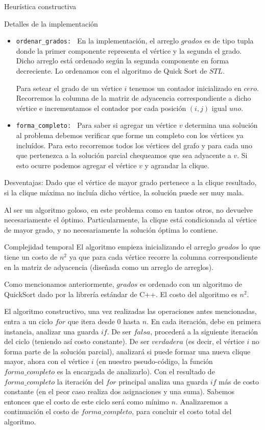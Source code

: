 \begin{section}{Heurística constructiva}
\begin{subsection}{Detalles de la implementación}
			\begin{itemize}
				\item \texttt{ordenar\_grados: } En la implementación, el arreglo $grados$ es de tipo tupla donde la primer componente representa el vértice y la segunda el grado. Dicho arreglo está ordenado según la segunda componente en forma decreciente. Lo ordenamos con el algoritmo de Quick Sort de $STL$.
				
				Para setear el grado de un vértice $i$ tenemos un contador inicializado en $cero$. Recorremos la columna de la matriz de adyacencia correspondiente a dicho vértice e incrementamos el contador por cada posición $(i,j)$ igual $uno$.
				\item \texttt{forma\_completo: } Para saber si agregar un vértice $v$ determina una solución al problema debemos verificar que forme un completo con los vértices ya incluídos. Para esto recorremos todos los vértices del grafo y para cada uno que pertenezca a la solución parcial chequeamos que sea adyacente a $v$. Si esto ocurre podemos agregar el vértice $v$ y agrandar la clique.
			\end{itemize}
		\end{subsection}
		\begin{subsection}{Desventajas: }
			Dado que el vértice de mayor grado pertenece a la clique resultado, si la clique máxima no incluía dicho vértice, la solución puede ser muy mala.
			
			Al ser un algoritmo goloso, en este problema como en tantos otros, no devuelve necesariamente el óptimo. Particularmente, la clique está condicionada al vértice de mayor grado, y no necesariamente la solución óptima lo contiene.
		\end{subsection}
		\begin{subsection}{Complejidad temporal}
			El algoritmo empieza inicializando el arreglo $grados$ lo que tiene un costo de $n^2$ ya que para cada vértice recorre la columna correspondiente en la matriz de adyacencia (diseñada como un arreglo de arreglos).
			
			Como mencionamos anteriormente, $grados$ es ordenado con un algoritmo de QuickSort dado por la librería estándar de C++. El costo del algoritmo es $n^2$.
			
			El algoritmo constructivo, una vez realizadas las operaciones antes mencionadas, entra a un ciclo $for$ que itera desde $0$ hasta $n$. En cada iteración, debe en primera instancia, analizar una guarda $if$. De ser $falsa$, procederá a la siguiente iteración del ciclo (teniendo así costo constante). De ser $verdadera$ (es decir, el vértice $i$ no forma parte de la solución parcial), analizará si puede formar una nueva clique mayor, ahora con el vértice $i$ (en nuestro pseudo-código, la función $forma\_completo$ es la encargada de analizarlo). Con el resultado de $forma\_completo$ la iteración del $for$ principal analiza una guarda $if$ más de costo constante (en el peor caso realiza dos asignaciones y una suma). Sabemos entonces que el costo de este ciclo será como mínimo $n$. Analizaremos a continuación el costo de $forma\_completo$, para concluir el costo total del algoritmo.
			

\end{subsection}
\end{section}

